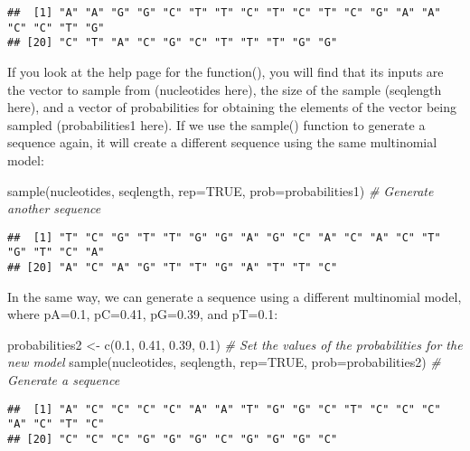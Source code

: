 \documentclass[
]{book}
\newenvironment{Shaded}{\begin{snugshade}}{\end{snugshade}}
\newcommand{\AttributeTok}[1]{\textcolor[rgb]{0.77,0.63,0.00}{#1}}
\newcommand{\CommentTok}[1]{\textcolor[rgb]{0.56,0.35,0.01}{\textit{#1}}}
\newcommand{\ConstantTok}[1]{\textcolor[rgb]{0.00,0.00,0.00}{#1}}
\newcommand{\FloatTok}[1]{\textcolor[rgb]{0.00,0.00,0.81}{#1}}
\newcommand{\FunctionTok}[1]{\textcolor[rgb]{0.00,0.00,0.00}{#1}}
\newcommand{\NormalTok}[1]{#1}
\newcommand{\OtherTok}[1]{\textcolor[rgb]{0.56,0.35,0.01}{#1}}
\begin{document}
\begin{verbatim}
##  [1] "A" "A" "G" "G" "C" "T" "T" "C" "T" "C" "T" "C" "G" "A" "A" "C" "C" "T" "G"
## [20] "C" "T" "A" "C" "G" "C" "T" "T" "T" "G" "G"
\end{verbatim}

If you look at the help page for the function(), you will find that its inputs are the vector to sample from (nucleotides here), the size of the sample (seqlength here), and a vector of probabilities for obtaining the elements of the vector being sampled (probabilities1 here). If we use the sample() function to generate a sequence again, it will create a different sequence using the same multinomial model:

\begin{Shaded}
\begin{Highlighting}[]
\FunctionTok{sample}\NormalTok{(nucleotides, seqlength, }\AttributeTok{rep=}\ConstantTok{TRUE}\NormalTok{, }\AttributeTok{prob=}\NormalTok{probabilities1) }\CommentTok{\# Generate another sequence}
\end{Highlighting}
\end{Shaded}

\begin{verbatim}
##  [1] "T" "C" "G" "T" "T" "G" "G" "A" "G" "C" "A" "C" "A" "C" "T" "G" "T" "C" "A"
## [20] "A" "C" "A" "G" "T" "T" "G" "A" "T" "T" "C"
\end{verbatim}

In the same way, we can generate a sequence using a different multinomial model, where pA=0.1, pC=0.41, pG=0.39, and pT=0.1:

\begin{Shaded}
\begin{Highlighting}[]
\NormalTok{probabilities2 }\OtherTok{\textless{}{-}} \FunctionTok{c}\NormalTok{(}\FloatTok{0.1}\NormalTok{, }\FloatTok{0.41}\NormalTok{, }\FloatTok{0.39}\NormalTok{, }\FloatTok{0.1}\NormalTok{) }\CommentTok{\# Set the values of the probabilities for the new model}
\FunctionTok{sample}\NormalTok{(nucleotides, seqlength, }\AttributeTok{rep=}\ConstantTok{TRUE}\NormalTok{, }\AttributeTok{prob=}\NormalTok{probabilities2) }\CommentTok{\# Generate a sequence}
\end{Highlighting}
\end{Shaded}

\begin{verbatim}
##  [1] "A" "C" "C" "C" "C" "A" "A" "T" "G" "G" "C" "T" "C" "C" "C" "A" "C" "T" "C"
## [20] "C" "C" "C" "G" "G" "G" "C" "G" "G" "G" "C"
\end{verbatim}
\end{document}
